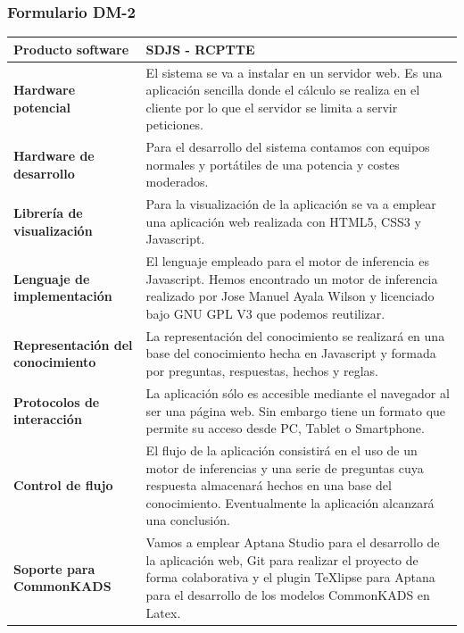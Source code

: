 \documentclass[a4paper,11pt]{article}
\begin{document}
			\subsubsection{Formulario DM-2}
			\begin{center}
				\begin{tabular}{| p{4.8cm} | p{6.5cm} |}
					\hline
					\cellcolor[RGB]{224,233,250}\textbf{Producto software} & SDJS - RCPTTE \\
					\hline
					\cellcolor[RGB]{224,233,250}\textbf{Hardware potencial} & El sistema se va
					a instalar en un servidor web. Es una aplicación sencilla donde el cálculo se realiza en el cliente por lo que el servidor se limita a servir peticiones.\\
					\hline
					\cellcolor[RGB]{224,233,250}\textbf{Hardware de desarrollo} & Para el
					desarrollo del sistema contamos con equipos normales y portátiles de una potencia y costes moderados.\\
					\hline
					\cellcolor[RGB]{224,233,250}\textbf{Librería de visualización} & Para la
					visualización de la aplicación se va a emplear una aplicación web realizada con HTML5, CSS3 y Javascript.\\
					\hline
					\cellcolor[RGB]{224,233,250}\textbf{Lenguaje de implementación} & El
					lenguaje empleado para el motor de inferencia es Javascript. Hemos encontrado un motor de inferencia realizado por Jose Manuel Ayala Wilson y licenciado bajo GNU GPL V3 que podemos reutilizar.\\
					\hline
					\cellcolor[RGB]{224,233,250}\textbf{Representación del conocimiento} & La
					representación del conocimiento se realizará en una base del conocimiento hecha en Javascript y formada por preguntas, respuestas, hechos y reglas.\\
					\hline
					\cellcolor[RGB]{224,233,250}\textbf{Protocolos de interacción} & La
					aplicación sólo es accesible mediante el navegador al ser una página web. Sin embargo tiene un formato que permite su acceso desde PC, Tablet o Smartphone.\\
					\hline
					\cellcolor[RGB]{224,233,250}\textbf{Control de flujo} & El flujo de la
					aplicación consistirá en el uso de un motor de inferencias y una serie de preguntas cuya respuesta almacenará hechos en una base del conocimiento. Eventualmente la aplicación alcanzará una conclusión.\\
					\hline
					\cellcolor[RGB]{224,233,250}\textbf{Soporte para CommonKADS} & Vamos a
					emplear Aptana Studio para el desarrollo de la aplicación web, Git para realizar el proyecto de forma colaborativa y el plugin TeXlipse para Aptana para el desarrollo de los modelos CommonKADS en Latex.\\
					\hline
				\end{tabular}
			\end{center}
\end{document}
